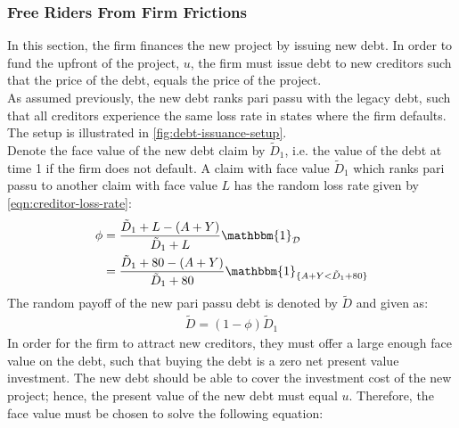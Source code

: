 \documentclass[main.tex]{subfiles}
\begin{document}
    \subsubsection{Free Riders From Firm Frictions}
    \label{sec:example-risk-free-project-debt-issuance}
        In this section, the firm finances the new project by issuing new debt.
        In order to fund the upfront of the project, $u$, 
        the firm must issue debt to new creditors such that the price of the debt, 
        equals the price of the project.
        \\
        As assumed previously, the new debt ranks pari passu with the legacy debt, 
        such that all creditors experience the same loss rate in states where the firm defaults.
        The setup is illustrated in \cref{fig:debt-issuance-setup}.
        \\
        Denote the face value of the new debt claim by $\tilde{D}_{1}$, 
        i.e. the value of the debt at time 1 if the firm does not default. 
        A claim with face value $\tilde{D}_{1}$ which ranks pari passu to another claim 
        with face value $L$ has the random loss rate given by \cref{eqn:creditor-loss-rate}:
            \begin{align*}
                \phi
                &=
                    \frac{
                        \tilde{D}_{1} + L - (A + Y)
                    }{
                        \tilde{D}_{1} + L
                    }
                    \mathbbm{1}_{\mathcal{D}}
                \nonumber \\
                &=
                    \frac{
                        \tilde{D}_{1} + \num{80} - (A + Y)
                    }{
                        \tilde{D}_{1} + \num{80}
                    }
                    \mathbbm{1}_{\{A + Y < \tilde{D}_{1} + \num{80}\}} 
            \end{align*}
        The random payoff of the new pari passu debt is denoted by $\tilde{D}$ and given as:
            \begin{align*}
                \tilde{D}
                    = (1 - \phi)\tilde{D}_{1}
            \end{align*}
        In order for the firm to attract new creditors,
        they must offer a large enough face value on the debt, 
        such that buying the debt is a zero net present value investment.
        The new debt should be able to cover the investment cost of the new project;
        hence, the present value of the new debt must equal $u$.
        Therefore, the face value must be chosen to solve the following equation:
\end{document}
